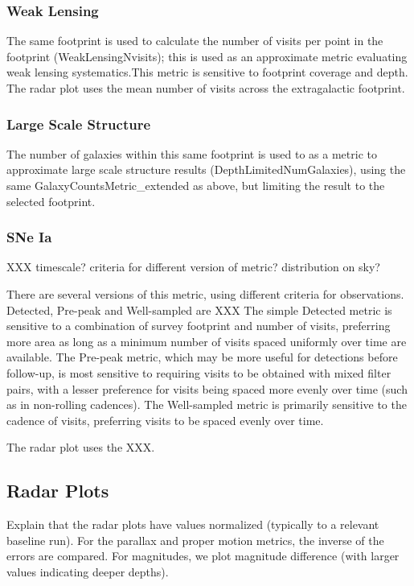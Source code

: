\subsubsection{Weak Lensing}
The same footprint is used to calculate the number of visits per point in the footprint (WeakLensingNvisits); this is used as an approximate metric evaluating weak lensing systematics.This metric is sensitive to footprint coverage and depth. 
The radar plot uses the mean number of visits across the extragalactic footprint. 

\subsubsection{Large Scale Structure}
The number of galaxies within this same footprint is used to as a metric to approximate large scale structure results (DepthLimitedNumGalaxies), using the same GalaxyCountsMetric\_extended as above, but limiting the result to the selected footprint. 

\subsubsection{SNe Ia}

XXX timescale? criteria for different version of metric? distribution on sky?

There are several versions of this metric, using different criteria for observations. Detected, Pre-peak and Well-sampled are XXX
The simple Detected metric is sensitive to a combination of survey footprint and number of visits, preferring more area as long as a minimum number of visits spaced uniformly over time are available. The Pre-peak metric, which may be more useful for detections before follow-up, is most sensitive to requiring visits to be obtained with mixed filter pairs, with a lesser preference for visits being spaced more evenly over time (such as in non-rolling cadences). The Well-sampled metric is primarily sensitive to the cadence of visits, preferring visits to be spaced evenly over time. 

The radar plot uses the XXX. 


\subsection{Radar Plots}

Explain that the radar plots have values normalized (typically to a relevant baseline run). For the parallax and proper motion metrics, the inverse of the errors are compared. For magnitudes, we plot magnitude difference (with larger values indicating deeper depths).
